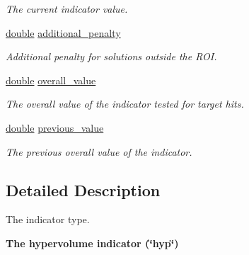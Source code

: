 \begin{DoxyCompactItemize}
\begin{DoxyCompactList}\small\item\em The current indicator value. \end{DoxyCompactList}\item 
\hyperlink{classdouble}{double} \hyperlink{structlogger__biobj__indicator__t_a544c33fa2e37fdcd85655604f5c6b89d}{additional\+\_\+penalty}\hypertarget{structlogger__biobj__indicator__t_a544c33fa2e37fdcd85655604f5c6b89d}{}\label{structlogger__biobj__indicator__t_a544c33fa2e37fdcd85655604f5c6b89d}

\begin{DoxyCompactList}\small\item\em Additional penalty for solutions outside the R\+OI. \end{DoxyCompactList}\item 
\hyperlink{classdouble}{double} \hyperlink{structlogger__biobj__indicator__t_ac3dca7e2bff656c34b5bc694481aab2c}{overall\+\_\+value}\hypertarget{structlogger__biobj__indicator__t_ac3dca7e2bff656c34b5bc694481aab2c}{}\label{structlogger__biobj__indicator__t_ac3dca7e2bff656c34b5bc694481aab2c}

\begin{DoxyCompactList}\small\item\em The overall value of the indicator tested for target hits. \end{DoxyCompactList}\item 
\hyperlink{classdouble}{double} \hyperlink{structlogger__biobj__indicator__t_a09320152b0919518cd43b1b3410c4269}{previous\+\_\+value}\hypertarget{structlogger__biobj__indicator__t_a09320152b0919518cd43b1b3410c4269}{}\label{structlogger__biobj__indicator__t_a09320152b0919518cd43b1b3410c4269}

\begin{DoxyCompactList}\small\item\em The previous overall value of the indicator. \end{DoxyCompactList}\end{DoxyCompactItemize}


\subsection{Detailed Description}
The indicator type. 

{\bfseries  The hypervolume indicator (\char`\"{}hyp\char`\"{}) }

